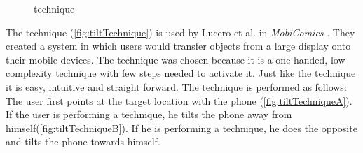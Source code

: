 \begin{figure}[H]
	\caption{\push \throw technique}
	\label{fig:throwTechnique}
\end{figure}

The \tilt technique (\cref{fig:tiltTechnique}) is used by Lucero et al. in \emph{MobiComics} \cite{Lucero:2012}.
They created a system in which users would transfer objects from a large display onto their mobile devices.
The \throw technique was chosen because it is a one handed, low complexity technique with few steps needed to activate it. 
Just like the \swipe technique it is easy, intuitive and straight forward. 
The \tilt technique is performed as follows:
The user first points at the target location with the phone (\cref{fig:tiltTechniqueA}).
If the user is performing a \push technique, he tilts the phone away from himself(\cref{fig:tiltTechniqueB}).
If he is performing a \pull technique, he does the opposite and tilts the phone towards himself. 

